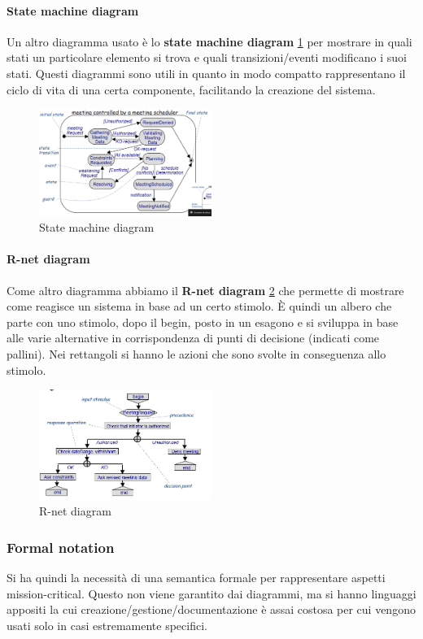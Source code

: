 \paragraph{State machine diagram}
Un altro diagramma usato è lo \textbf{state machine diagram} \ref{fig:smd} per
mostrare in quali stati un particolare elemento si trova e quali transizioni/eventi
modificano i suoi stati. Questi diagrammi sono utili in quanto in modo compatto
rappresentano il ciclo di vita di una certa componente, facilitando la creazione
del sistema.
\begin{figure}[!ht]
      \centering
      \includegraphics[width=0.5\textwidth]{img/requirements/smd.png}
      \caption{State machine diagram}
      \label{fig:smd}
\end{figure}
\paragraph{R-net diagram}
Come altro diagramma abbiamo il \textbf{R-net diagram} \ref{fig:r-net-diagram}
che permette di mostrare come reagisce un sistema in base ad un certo stimolo.
È quindi un albero che parte con uno stimolo, dopo il begin, posto in un esagono
e si sviluppa in base alle varie alternative in corrispondenza di punti di
decisione (indicati come pallini). Nei rettangoli si hanno le azioni che sono
svolte in conseguenza allo stimolo.
\begin{figure}[!ht]
      \centering
      \includegraphics[width=0.5\textwidth]{img/requirements/r-net-diagram.png}
      \caption{R-net diagram}
      \label{fig:r-net-diagram}
\end{figure}
\subsubsection{Formal notation}
Si ha quindi la necessità di una semantica formale per rappresentare aspetti
mission-critical. Questo non viene garantito dai diagrammi, ma si hanno
linguaggi appositi la cui creazione/gestione/documentazione è assai costosa per
cui vengono usati solo in casi estremamente specifici.

